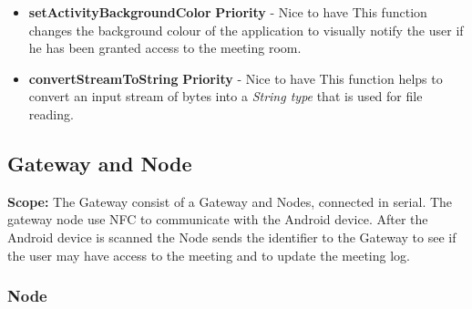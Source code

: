 \documentclass[a4paper,12pt,titlepage]{article}
\begin{document}
\begin{itemize}
			\item \textbf{setActivityBackgroundColor}
				\newline\textbf{ Priority } - Nice to have
				\newline This function changes the background colour of the application to visually notify the user if he has been granted access to the meeting room.

			\item \textbf{convertStreamToString}
				\newline\textbf{ Priority } - Nice to have
				\newline This function helps to convert an input stream of bytes into a \textit{String type} that is used for file reading.


		\end{itemize}

\newpage		
		\subsection{Gateway and Node}
\textbf{Scope: }The Gateway consist of a Gateway and Nodes, connected in serial. The gateway node use NFC to communicate with the Android device. After the Android device is scanned the Node sends the identifier to the Gateway to see if the user may have access to the meeting and to update the meeting log. 

		\subsubsection{Node}
\end{document}
